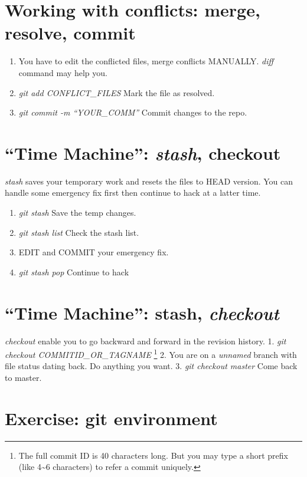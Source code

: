 \documentclass[]{article}
\begin{document}
\section{Working with conflicts: merge, resolve, commit}

\begin{enumerate}[1.]
\item
  You have to edit the conflicted files, merge conflicts MANUALLY.
  \emph{diff} command may help you.
\item
  \emph{git add CONFLICT\_FILES} Mark the file as resolved.
\item
  \emph{git commit -m ``YOUR\_COMM''} Commit changes to the repo.
\end{enumerate}
\section{``Time Machine'': \emph{stash}, checkout}

\emph{stash} saves your temporary work and resets the files to HEAD
version. You can handle some emergency fix first then continue to hack
at a latter time.

\begin{enumerate}[1.]
\item
  \emph{git stash} Save the temp changes.
\item
  \emph{git stash list} Check the stash list.
\item
  EDIT and COMMIT your emergency fix.
\item
  \emph{git stash pop} Continue to hack
\end{enumerate}
\section{``Time Machine'': stash, \emph{checkout}}

\emph{checkout} enable you to go backward and forward in the revision
history. 1. \emph{git checkout COMMITID\_OR\_TAGNAME} \footnote{The full
  commit ID is 40 characters long. But you may type a short prefix (like
  4\textasciitilde{}6 characters) to refer a commit uniquely.} 2. You
are on a \emph{unnamed} branch with file status dating back. Do anything
you want. 3. \emph{git checkout master} Come back to master.

\section{Exercise: git environment}
\end{document}
